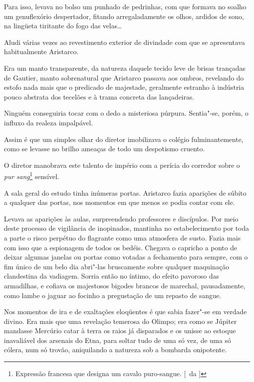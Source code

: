 Para isso, levava no bolso um punhado de pedrinhas, com que
formava no soalho um genuflexório despertador, fitando arregaladamente
os olhos, ardidos de sono, na lingüeta tiritante do fogo das velas\ldots{}

Aludi várias vezes ao revestimento exterior de divindade com que se
apresentava habitualmente Aristarco. 

Era um manto transparente, da
natureza daquele tecido leve de brisas trançadas de Gautier, manto
sobrenatural que Aristarco passava aos ombros, revelando do estofo nada
mais que o predicado de majestade, geralmente estranho à indústria
pouco abstrata dos tecelões e à trama concreta das lançadeiras. 

Ninguém conseguiria tocar com o dedo a misteriosa púrpura. Sentia"-se, porém,
o influxo da realeza impalpável.

Assim é que um simples olhar do diretor imobilizava o colégio
fulminantemente, como se levasse no brilho ameaças de todo um
despotismo cruento. 

O diretor manobrava este talento de império com a
perícia do corredor sobre o \textit{pur sang}\footnote{ Expressão francesa que designa 
um cavalo puro-sangue. [~da ]} sensível. 

A sala geral do estudo
tinha inúmeras portas. Aristarco fazia aparições de súbito a qualquer
das portas, nos momentos em que menos se podia contar com ele. 

Levava as aparições às aulas, surpreendendo professores e discípulos. Por meio
deste processo de vigilância de inopinados, mantinha no estabelecimento
por toda a parte o risco perpétuo do flagrante como uma atmosfera de
susto. Fazia mais com isso que a espionagem de todos os bedéis. Chegava
o capricho a ponto de deixar algumas janelas ou portas como votadas a
fechamento para sempre, com o fim único de um belo dia abri"-las
bruscamente sobre qualquer maquinação clandestina da vadiagem. Sorria
então no íntimo, do efeito pavoroso das armadilhas, e cofiava os
majestosos bigodes brancos de marechal, pausadamente, como lambe o
jaguar ao focinho a pregustação de um repasto de sangue. 

Nos momentos de ira e de exaltações eloqüentes é que sabia fazer"-se em verdade
divino. Era mais que uma revelação temerosa do Olimpo; era como se
Júpiter mandasse Mercúrio catar à terra os raios já disparados e os
unisse ao estoque inavaliável dos arsenais do Etna, para soltar tudo de
uma só vez, de uma só cólera, num só trovão, aniquilando a natureza sob
a bombarda onipotente. 

